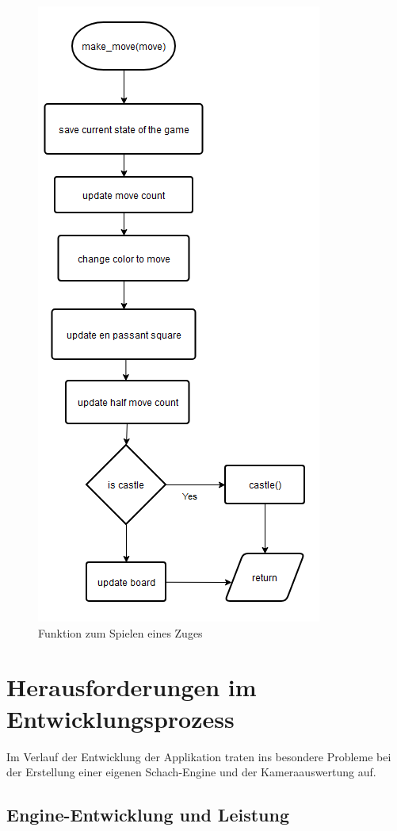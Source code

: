 \begin{figure}[H]
    \centering
    \includegraphics[scale=0.6]{images/make_move_function.png}
    \caption{Funktion zum Spielen eines Zuges}
\end{figure} 

\section{Herausforderungen im Entwicklungsprozess}
Im Verlauf der Entwicklung der Applikation traten ins besondere Probleme bei der Erstellung einer eigenen Schach-Engine und der Kameraauswertung auf.

\subsection{Engine-Entwicklung und Leistung}

